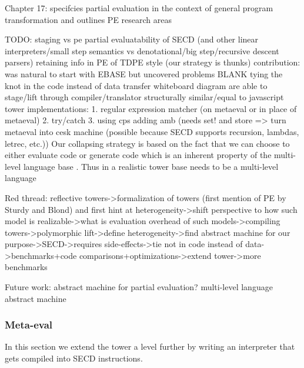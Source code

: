 \documentclass[fleqn]{article}
\theoremstyle{definition}
\begin{document}
Chapter 17: specifcies partial evaluation in the context of general program transformation and outlines PE research areas

TODO:
staging vs pe
partial evaluatability of SECD (and other linear interpreters/small step semantics vs denotational/big step/recursive descent parsers)
retaining info in PE of TDPE style (our strategy is thunks)
contribution: was natural to start with EBASE but uncovered problems BLANK
tying the knot in the code instead of data
transfer whiteboard diagram
are able to stage/lift through compiler/translator
structurally similar/equal to javascript tower
implementations:
	1. regular expression matcher (on metaeval or in place of metaeval)
	2. try/catch
	3. using cps adding amb (needs set! and store => turn metaeval into cesk machine (possible because SECD supports recursion, lambdas, letrec, etc.))
Our collapsing strategy is based on the fact that we can choose to either evaluate code or generate code which is an inherent property of the multi-level language base \mslang. Thus in a realistic tower base needs to be a multi-level language

Red thread:
reflective towers->formalization of towers (first mention of PE by Sturdy and Blond) and first hint at heterogeneity->shift perspective to how such model is realizable->what is evaluation overhead of such models->compiling towers->polymorphic lift->define heterogeneity->find abstract machine for our purpose->SECD->requires side-effects->tie not in code instead of data->benchmarks+code comparisons+optimizations->extend tower->more benchmarks

Future work:
abstract machine for partial evaluation? multi-level language abstract machine

\subsubsection{Meta-eval}
In this section we extend the tower a level further by writing an interpreter that gets compiled into SECD instructions.




\end{document}
